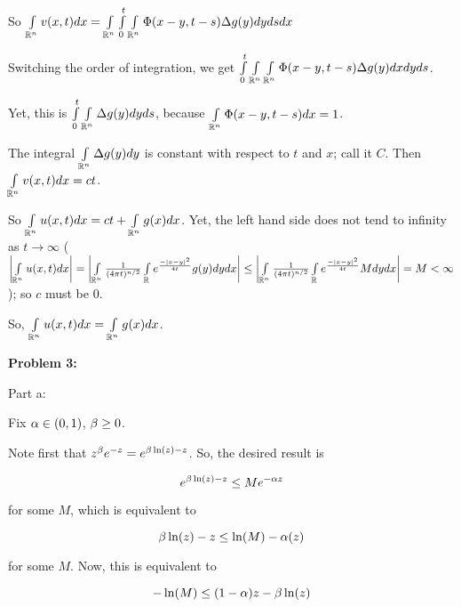 \documentclass[a4paper,12pt]{article}
\begin{document}
So $\int\limits_{\mathbb{R}^n} v(x,t) dx = \int\limits_{\mathbb{R}^n} \int\limits_0^t \int\limits_{\mathbb{R}^n} \Phi(x-y,t-s) \Delta g(y) dy ds dx$

Switching the order of integration, we get $ \int\limits_0^t \int\limits_{\mathbb{R}^n} \int\limits_{\mathbb{R}^n} \Phi(x-y,t-s) \Delta g(y) dx dy ds$.

Yet, this is $ \int\limits_0^t \int\limits_{\mathbb{R}^n} \Delta g(y) dy ds$, because $\int\limits_{\mathbb{R}^n} \Phi(x-y,t-s) dx = 1$. 

The integral $\int\limits_{\mathbb{R}^n} \Delta g(y) dy$ is constant with respect to $t$ and $x$; call it $C$. Then $\int\limits_{\mathbb{R}^n} v(x,t) dx = ct$.

So $\int\limits_{\mathbb{R}^n} u(x,t) dx = ct + \int\limits_{\mathbb{R}^n} g(x) dx$. Yet, the left hand side does not tend to infinity as $t \to \infty$ ($\left\lvert \int\limits_{\mathbb{R}^n} u(x,t) dx \right\rvert = \left\lvert \int\limits_{\mathbb{R}^n} \frac{1}{(4\pi t)^{n/2}}\int\limits_{\mathbb{R}} e^{\frac{-\left\lvert x-y \right\rvert^2}{4t}} g(y) dy dx \right\rvert \leq \left\lvert \int\limits_{\mathbb{R}^n} \frac{1}{(4\pi t)^{n/2}}\int\limits_{\mathbb{R}} e^{\frac{-\left\lvert x-y \right\rvert^2}{4t}} M dy dx \right\rvert = M < \infty$); so $c$ must be $0$.


So, $\int\limits_{\mathbb{R}^n} u(x,t) dx = \int\limits_{\mathbb{R}^n} g(x) dx$.

\shunt

{\bf Problem 3:}

Part a:

Fix $\alpha \in (0,1)$, $\beta \geq 0$.

Note first that $z^\beta e^{-z} = e^{\beta \ln(z) - z}$. So, the desired result is

\begin{displaymath}
e^{\beta \ln(z) - z} \leq M e^{-\alpha z}
\end{displaymath}

for some $M$, which is equivalent to

\begin{displaymath}
\beta \ln(z) - z \leq \ln(M) - \alpha(z)
\end{displaymath}

for some $M$. Now, this is equivalent to 

\begin{displaymath}
- \ln(M) \leq (1-\alpha)z - \beta \ln(z)
\end{displaymath}
\end{document}
